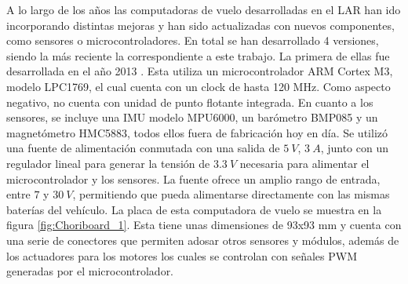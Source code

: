 



A lo largo de los años las computadoras de vuelo desarrolladas en el LAR han ido incorporando distintas mejoras y han sido actualizadas con nuevos componentes, como sensores o microcontroladores. En total se han desarrollado 4 versiones, siendo la más reciente la correspondiente a este trabajo. La primera de ellas fue desarrollada en el año 2013 \cite{Pose2014}. Esta utiliza un microcontrolador ARM Cortex M3, modelo LPC1769, el cual cuenta con un clock de hasta 120 MHz. Como aspecto negativo, no cuenta con unidad de punto flotante integrada. En cuanto a los sensores, se incluye una IMU modelo MPU6000, un barómetro BMP085 y un magnetómetro HMC5883, todos ellos fuera de fabricación hoy en día. Se utilizó una fuente de alimentación conmutada con una salida de $5 \ V$, $3 \ A$, junto con un regulador lineal para generar la tensión de $3.3 \ V$ necesaria para alimentar el microcontrolador y los sensores. La fuente ofrece un amplio rango de entrada, entre $7$ y $30 \ V$, permitiendo que pueda alimentarse directamente con las mismas baterías del vehículo. La placa de esta computadora de vuelo se muestra en la figura \ref{fig:Choriboard_1}. Esta tiene unas dimensiones de 93x93 mm y cuenta con una serie de conectores que permiten adosar otros sensores y módulos, además de los actuadores para los motores los cuales se controlan con señales PWM generadas por el microcontrolador.

